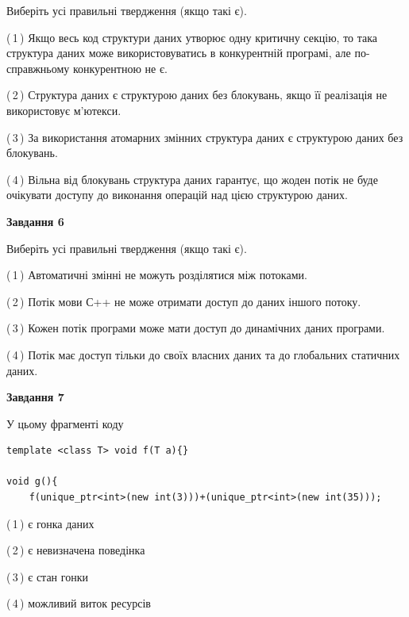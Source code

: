 \documentclass[12pt, ukrainian]{article}
\begin{document}
\begin {large}
{Виберіть усі правильні твердження (якщо такі є).\par
\vspace{2mm}

(\,1\,) Якщо весь код структури даних утворює одну критичну секцію, то така структура даних може використовуватись в конкурентній програмі, але по-справжньо\-му конкурентною не є.%

(\,2\,) Структура даних є структурою даних без блокувань, якщо її реалізація не використовує м’ютекси.%

(\,3\,) За використання атомарних змінних структура даних є структурою даних без блокувань.%

(\,4\,) Вільна від блокувань структура даних гарантує, що жоден потік не буде очікувати доступу до виконання операцій над цією структурою даних.%
\newpage


\begin{center}
\textbf{Завдання 6}
\end{center}

Виберіть усі правильні твердження (якщо такі є).\par
\vspace{2mm}

(\,1\,) Автоматичні змінні не можуть розділятися між потоками.%

(\,2\,) Потік мови С++ не може отримати доступ до даних іншого потоку.%

(\,3\,) Кожен потік програми може мати доступ до динамічних даних програми.%

(\,4\,) Потік має доступ тільки до своїх власних даних та до глобальних статичних даних.%


\begin{center}
\textbf{Завдання 7}
\end{center}

У цьому фрагменті коду
\begin{verbatim}
template <class T> void f(T a){}

void g(){
    f(unique_ptr<int>(new int(3)))+(unique_ptr<int>(new int(35)));
\end{verbatim}

(\,1\,) є гонка даних%

(\,2\,) є невизначена поведінка%

(\,3\,) є стан гонки%

(\,4\,) можливий виток ресурсів%

}
\end {large}

\vspace{4mm}
\newpage
\end{document}
